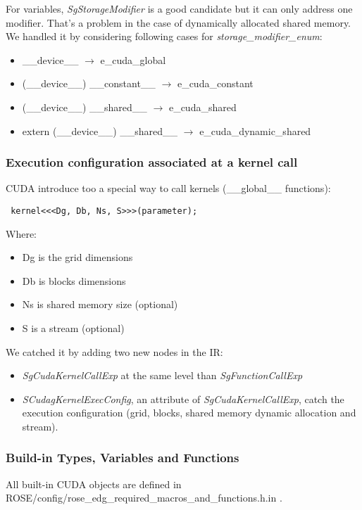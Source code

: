 For variables, \emph{SgStorageModifier} is a good candidate but it can only address one modifier. That's a problem in the case of dynamically allocated shared memory.
We handled it by considering following cases for \emph{storage\_modifier\_enum}:
		
\begin{itemize}
	\item \_\_device\_\_ $\rightarrow$ e\_cuda\_global
	\item (\_\_device\_\_) \_\_constant\_\_ $\rightarrow$ e\_cuda\_constant
	\item (\_\_device\_\_) \_\_shared\_\_ $\rightarrow$ e\_cuda\_shared
	\item extern (\_\_device\_\_) \_\_shared\_\_ $\rightarrow$ e\_cuda\_dynamic\_shared
\end{itemize}

			\subsubsection{Execution configuration associated at a kernel call}

CUDA introduce too a special way to call kernels (\_\_global\_\_ functions):
\begin{verbatim} kernel<<<Dg, Db, Ns, S>>>(parameter); \end{verbatim}
Where:
\begin{itemize}
	\item Dg is the grid dimensions
	\item Db is blocks dimensions
	\item Ns is shared memory size (optional)
	\item S is a stream (optional)
\end{itemize}
We catched it by adding two new nodes in the IR: 
\begin{itemize}
	\item \emph{SgCudaKernelCallExp} at the same level than \emph{SgFunctionCallExp}
	\item \emph{SCudagKernelExecConfig}, an attribute of \emph{SgCudaKernelCallExp}, catch the execution configuration (grid, blocks, shared memory dynamic allocation and stream).
\end{itemize}

			\subsubsection{Build-in Types, Variables and Functions}
			
All built-in CUDA objects are defined in ROSE/config/rose\_edg\_required\_macros\_and\_functions.h.in .
			
